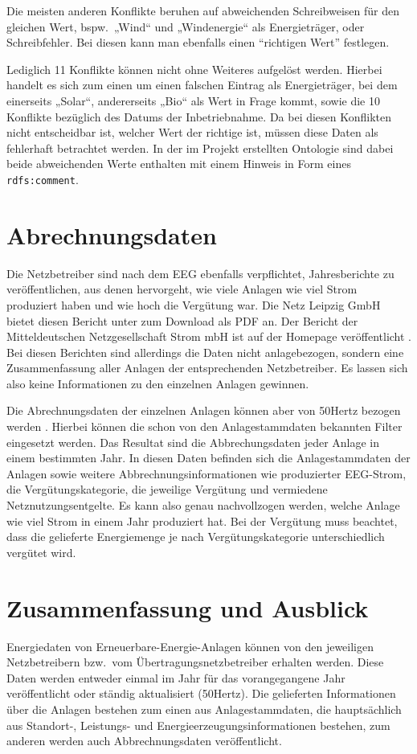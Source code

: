 \documentclass[a4paper,11pt]{article}
\begin{document}
Die meisten anderen Konflikte beruhen auf abweichenden Schreibweisen für den
gleichen Wert, bspw.\ „Wind“ und „Windenergie“ als Energieträger, oder
Schreibfehler. Bei diesen kann man ebenfalls einen ``richtigen Wert''
festlegen.

Lediglich 11 Konflikte können nicht ohne Weiteres aufgelöst werden. Hierbei
handelt es sich zum einen um einen falschen Eintrag als Energieträger, bei dem
einerseits „Solar“, andererseits „Bio“ als Wert in Frage kommt, sowie die 10
Konflikte bezüglich des Datums der Inbetriebnahme. Da bei diesen Konflikten
nicht entscheidbar ist, welcher Wert der richtige ist, müssen diese Daten als
fehlerhaft betrachtet werden. In der im Projekt erstellten Ontologie sind
dabei beide abweichenden Werte enthalten mit einem Hinweis in Form eines
\texttt{rdfs:comment}.

\section{Abrechnungsdaten}
\label{abbrechnungsdaten}
Die Netzbetreiber sind nach dem EEG ebenfalls verpflichtet, Jahresberichte zu
veröffentlichen, aus denen hervorgeht, wie viele Anlagen wie viel Strom
produziert haben und wie hoch die Vergütung war. Die Netz Leipzig GmbH bietet
diesen Bericht unter \cite{netzle-bericht} zum Download als PDF an. Der
Bericht der Mitteldeutschen Netzgesellschaft Strom mbH ist auf der Homepage
veröffentlicht \cite{mitnetz-bericht}. Bei diesen Berichten sind allerdings
die Daten nicht anlagebezogen, sondern eine Zusammenfassung aller Anlagen der
entsprechenden Netzbetreiber. Es lassen sich also keine Informationen zu den
einzelnen Anlagen gewinnen.

Die Abrechnungsdaten der einzelnen Anlagen können aber von 50Hertz bezogen
werden \cite{50hertz-bericht}. Hierbei können die schon von den
Anlagestammdaten bekannten Filter eingesetzt werden. Das Resultat sind die
Abbrechungsdaten jeder Anlage in einem bestimmten Jahr. In diesen Daten
befinden sich die Anlagestammdaten der Anlagen sowie weitere
Abbrechnungsinformationen wie produzierter EEG-Strom, die Vergütungskategorie,
die jeweilige Vergütung und vermiedene Netznutzungsentgelte. Es kann also
genau nachvollzogen werden, welche Anlage wie viel Strom in einem Jahr
produziert hat. Bei der Vergütung muss beachtet, dass die gelieferte
Energiemenge je nach Vergütungskategorie unterschiedlich vergütet wird.

\section{Zusammenfassung und Ausblick}
\label{summary}
Energiedaten von Erneuerbare-Energie-Anlagen können von den jeweiligen
Netzbetreibern bzw.\ vom Übertragungsnetzbetreiber erhalten werden. Diese
Daten werden entweder einmal im Jahr für das vorangegangene Jahr
veröffentlicht oder ständig aktualisiert (50Hertz). Die gelieferten
Informationen über die Anlagen bestehen zum einen aus Anlagestammdaten, die
hauptsächlich aus Standort-, Leistungs- und Energieerzeugungsinformationen
bestehen, zum anderen werden auch Abbrechnungsdaten veröffentlicht.
\end{document}
